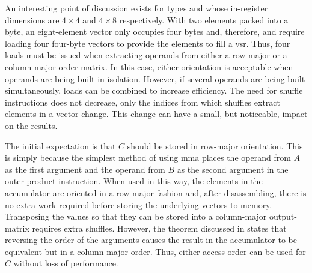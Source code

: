 \documentclass[\main/thesis.tex]{subfiles}
\begin{document}
An interesting point of discussion exists for types  and  whose in-register dimensions are $4 \times 4$ and $4 \times 8$ respectively.
With two  elements packed into a byte, an eight-element vector only occupies four bytes and, therefore,  and  require loading four four-byte vectors to provide the elements to fill a \gls{vsr}.
Thus, four loads must be issued when extracting operands from either a row-major or a column-major order matrix.
In this case, either orientation is acceptable when operands are being built in isolation.
However, if several operands are being built simultaneously, loads can be combined to increase efficiency.
The need for shuffle instructions does not decrease, only the indices from which shuffles extract elements in a vector change.
This change can have a small, but noticeable, impact on the results.

The initial expectation is that $C$ should be stored in row-major orientation.
This is simply because the simplest method of using \gls{mma} places the operand from $A$ as the first argument and the operand from $B$ as the second argument in the outer product instruction.
When used in this way, the elements in the accumulator are oriented in a row-major fashion and, after disassembling, there is no extra work required before storing the underlying vectors to memory.
Transposing the values so that they can be stored into a column-major output-matrix requires extra shuffles.
However, the theorem discussed in  states that reversing the order of the arguments causes the result in the accumulator to be equivalent but in a column-major order.
Thus, either access order can be used for $C$ without loss of performance.
\end{document}
